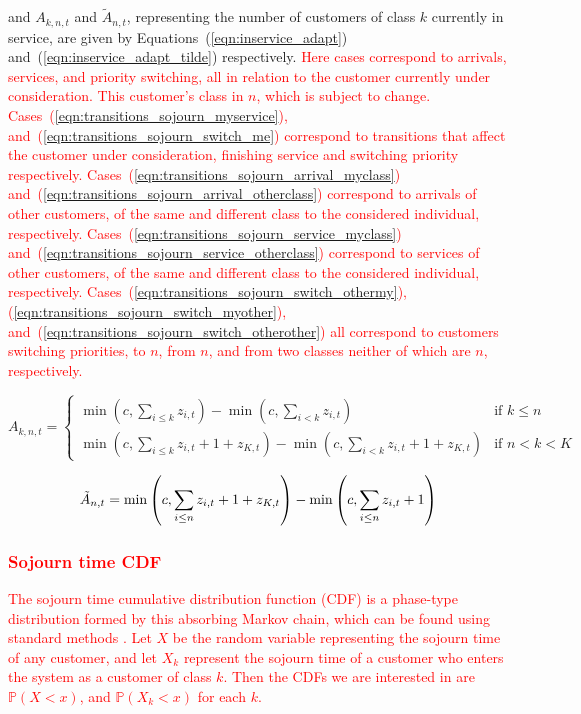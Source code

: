 \documentclass{article}
\begin{document}
and $A_{k,n,t}$ and $\tilde{A}_{n, t}$, representing the number of customers of
class $k$ currently in service, are given by
Equations~(\ref{eqn:inservice_adapt}) and~(\ref{eqn:inservice_adapt_tilde})
respectively.
\textcolor{red}{Here cases correspond to arrivals, services, and priority
switching, all in relation to the customer currently under consideration.
This customer's class in $n$, which is subject to change.
Cases~(\ref{eqn:transitions_sojourn_myservice}),
and~(\ref{eqn:transitions_sojourn_switch_me}) correspond to transitions that
affect the customer under consideration, finishing service and switching
priority respectively.
Cases~(\ref{eqn:transitions_sojourn_arrival_myclass})
and~(\ref{eqn:transitions_sojourn_arrival_otherclass}) correspond to arrivals of
other customers, of the same and different class to the considered individual,
respectively.
Cases~(\ref{eqn:transitions_sojourn_service_myclass})
and~(\ref{eqn:transitions_sojourn_service_otherclass}) correspond to services of
other customers, of the same and different class to the considered individual,
respectively.
Cases~(\ref{eqn:transitions_sojourn_switch_othermy}),
(\ref{eqn:transitions_sojourn_switch_myother}),
and~(\ref{eqn:transitions_sojourn_switch_otherother}) all correspond to
customers switching priorities, to $n$, from $n$, and from two classes neither
of which are $n$, respectively.}


\begin{equation}\label{eqn:inservice_adapt}
A_{k,n,t} =
\begin{cases}
\min\left(c, \sum_{i \leq k} z_{i,t}\right) - \min\left(c, \sum_{i < k} z_{i,t}\right) & \text{if } k \leq n \\
\min\left(c, \sum_{i \leq k} z_{i,t} + 1 + z_{K,t}\right) - \min\left(c, \sum_{i < k} z_{i,t} + 1 + z_{K,t}\right) & \text{if } n < k < K
\end{cases}
\end{equation}

\begin{equation}\label{eqn:inservice_adapt_tilde}
\tilde{A}_{n,t} =
\min\left(c, \sum_{i \leq n} z_{i,t} + 1 + z_{K,t}\right) - \min\left(c, \sum_{i \leq n} z_{i,t} + 1\right) \\
\end{equation}

\textcolor{red}{\subsubsection{Sojourn time CDF}}
\textcolor{red}{The sojourn time cumulative distribution function (CDF) is a
phase-type distribution formed by this absorbing Markov chain, which can be
found using standard methods \cite{stewart09}.
Let $X$ be the random variable representing the sojourn time of any customer,
and let $X_k$ represent the sojourn time of a customer who enters the system as
a customer of class $k$. Then the CDFs we are interested in are
$\mathbb{P}(X < x)$, and $\mathbb{P}(X_k < x)$ for each $k$.}
\end{document}
